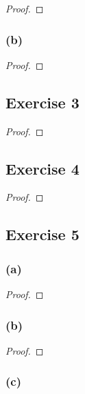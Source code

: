\documentclass[14pt]{extarticle}
\begin{document}
\begin{proof}

\end{proof}

\subsubsection{(b)}

\begin{proof}

\end{proof}

\subsection{Exercise 3}

\begin{proof}

\end{proof}

\subsection{Exercise 4}

\begin{proof}

\end{proof}

\subsection{Exercise 5}

\subsubsection{(a)}

\begin{proof}

\end{proof}

\subsubsection{(b)}

\begin{proof}

\end{proof}

\subsubsection{(c)}
\end{document}
